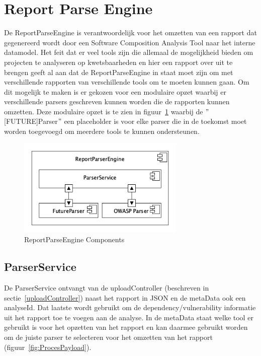 \section{Report Parse Engine}\label{sec:report-parse-engine}
De ReportParseEngine is verantwoordelijk voor het omzetten van een rapport dat gegenereerd wordt door een Software Composition Analysis Tool naar het interne datamodel. Het feit dat er veel tools zijn die allemaal de mogelijkheid bieden om projecten te analyseren op kwetsbaarheden en hier een rapport over uit te brengen geeft al aan dat de ReportParseEngine in staat moet zijn om met verschillende rapporten van verschillende tools om te moeten kunnen gaan. Om dit mogelijk te maken is er gekozen voor een modulaire opzet waarbij er verschillende parsers geschreven kunnen worden die de rapporten kunnen omzetten. Deze modulaire opzet is te zien in figuur~\ref{fig:ReportParseComponents} waarbij de $"$[FUTURE]Parser$"$ een placeholder is voor elke parser die in de toekomst moet worden toegevoegd om meerdere tools te kunnen ondersteunen.
\begin{figure}[bth]
    \myfloatalign
    \includegraphics[width=8cm]{gfx/umlet/exports/ReportParserComponents}
    \caption{ReportParseEngine Components}
    \label{fig:ReportParseComponents}
\end{figure}

\subsection{ParserService}\label{subsec:reportservice}
De ParserService ontvangt van de uploadController (beschreven in sectie~\ref{uploadController}) naast het rapport in JSON en de metaData ook een analyseId. Dat laatste wordt gebruikt om de dependency/vulnerability informatie uit het rapport toe te voegen aan de analyse. In de metaData staat welke tool er gebruikt is voor het opzetten van het rapport en kan daarmee gebruikt worden om de juiste parser te selecteren voor het omzetten van het rapport (figuur~\ref{fig:ProcesPayload}).

